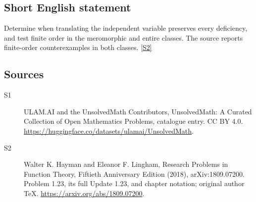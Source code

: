 \documentclass[11pt]{article}
\newcommand{\sref}[2]{\hyperlink{source:#1:#2}{[S#2]}}
\begin{document}
\subsection{Short English statement}
Determine when translating the independent variable preserves every deficiency, and test finite order in the meromorphic and entire classes. The source reports finite-order counterexamples in both classes. \sref{statement}{2}
\subsection{Sources}
\begin{description}
\item[\hypertarget{source:statement:1}{S1}] ULAM.AI and the UnsolvedMath Contributors, UnsolvedMath: A Curated Collection of Open Mathematics Problems, catalogue entry. CC BY 4.0. \url{https://huggingface.co/datasets/ulamai/UnsolvedMath}.
\item[\hypertarget{source:statement:2}{S2}] Walter K. Hayman and Eleanor F. Lingham, Research Problems in Function Theory, Fiftieth Anniversary Edition (2018), arXiv:1809.07200. Problem 1.23, its full Update 1.23, and chapter notation; original author TeX. \url{https://arxiv.org/abs/1809.07200}.
\end{description}
\label{end:statement}
\end{document}
